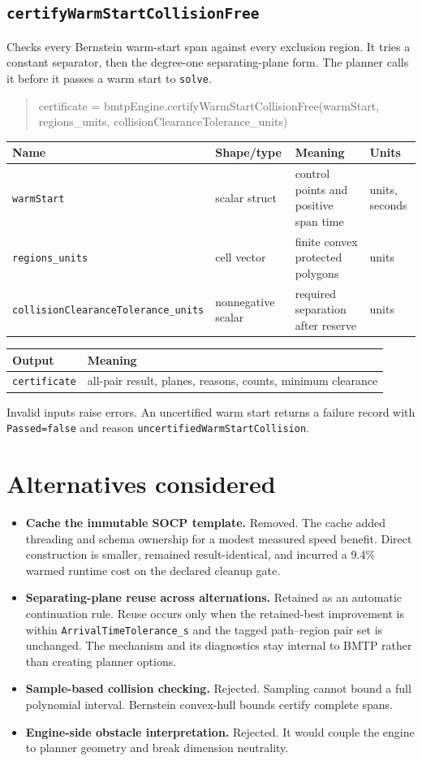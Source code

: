 \documentclass[11pt]{article}
\makeatletter
\newcommand{\iface}[5]{#1\par\begin{quote}\small\ttfamily\raggedright #2\par\end{quote}
\begin{tabularx}{\textwidth}{@{}p{.24\textwidth}p{.21\textwidth}Xp{.12\textwidth}@{}}\toprule Name & Shape/type & Meaning & Units \\\midrule #3\\\bottomrule\end{tabularx}
\begin{tabularx}{\textwidth}{@{}p{.30\textwidth}X@{}}\toprule Output & Meaning \\\midrule #4\\\bottomrule\end{tabularx}
\begingroup\sloppy #5\par\endgroup\medskip}
\makeatother
\begin{document}
\subsection{\texttt{certifyWarmStartCollisionFree}}
\iface{Checks every Bernstein warm-start span against every exclusion region.
It tries a constant separator, then the degree-one separating-plane form. The
planner calls it before it passes a warm start to \texttt{solve}.}
{certificate =\allowbreak{}
bmtpEngine.certifyWarmStartCollisionFree(warmStart,\allowbreak{}
regions\_units,\allowbreak{} collisionClearanceTolerance\_units)}
{\texttt{warmStart} & scalar struct & control points and positive span time & units, seconds \\
\texttt{regions\_units} & cell vector & finite convex protected polygons & units \\
\texttt{collisionClearance\allowbreak Tolerance\_units} & nonnegative scalar & required separation after reserve & units}
{\texttt{certificate} & all-pair result, planes, reasons, counts, minimum clearance}
{Invalid inputs raise errors. An uncertified warm start returns a failure
record with \texttt{Passed=false} and reason
\texttt{uncertifiedWarmStartCollision}.}

\section{Alternatives considered}

\begin{itemize}
    \item \textbf{Cache the immutable SOCP template.} Removed. The cache added
    threading and schema ownership for a modest measured speed benefit. Direct
    construction is smaller, remained result-identical, and incurred a 9.4\%
    warmed runtime cost on the declared cleanup gate.
    \item \textbf{Separating-plane reuse across alternations.} Retained as an
    automatic continuation rule. Reuse occurs only when the retained-best
    improvement is within \texttt{ArrivalTimeTolerance\_s} and the tagged
    path--region pair set is unchanged. The mechanism and its diagnostics stay
    internal to BMTP rather than creating planner options.
    \item \textbf{Sample-based collision checking.} Rejected. Sampling cannot bound a full
    polynomial interval. Bernstein convex-hull bounds certify complete spans.
    \item \textbf{Engine-side obstacle interpretation.} Rejected. It would couple the
    engine to planner geometry and break dimension neutrality.
\end{itemize}
\end{document}
